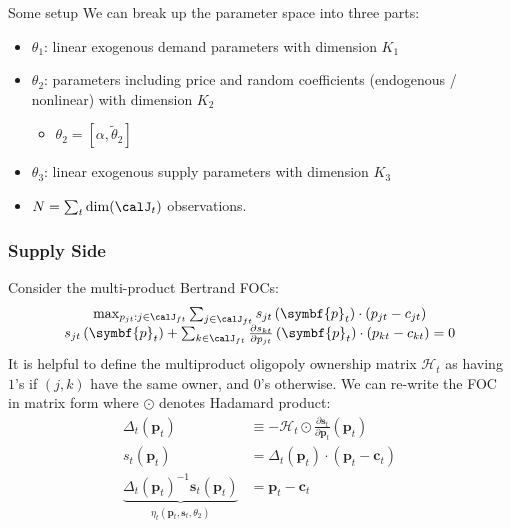\begin{frame}{Some setup}
We can break up the parameter space into three parts:
\begin{itemize}
\item $\theta_1$: linear exogenous demand parameters with dimension $K_1$
 \item $\theta_2$: parameters including price and random coefficients (endogenous / nonlinear) with dimension $K_2$
 \begin{itemize}
 \item $\theta_2 = [\alpha, \widetilde{\theta}_2]$
\end{itemize}
 \item $\theta_3$: linear exogenous supply parameters with dimension $K_3$
 \item $N = \sum_{t} \dim(\calJ_t)$ observations.
\end{itemize}
\end{frame}



\begin{frame}[plain]
\frametitle{Supply Side}
\footnotesize
Consider the multi-product Bertrand FOCs:
\begin{align*}
\begin{array}{c}
\max _{p_{j t}: j \in \calJ_{f t}} \sum_{j \in \calJ_{f t}} s_{j t}\left(\symbf{p}_{t}\right) \cdot\left(p_{j t}-c_{j t}\right) \\
s_{j t}\left(\symbf{p}_{t}\right)+\sum_{k \in \calJ_{f t}} \frac{\partial s_{k t}}{\partial p_{j t}}\left(\symbf{p}_{t}\right) \cdot\left(p_{k t}-c_{k t}\right)=0
\end{array}
\end{align*}
It is helpful to define the \alert{multiproduct oligopoly ownership matrix} $\mathcal{H}_t$ as having $1$'s if $(j,k)$ have the same owner, and $0$'s otherwise. We can re-write the FOC in matrix form where $\odot$ denotes Hadamard product:
\begin{align*}
\Delta_{t}\left(\symbf{p}_{t}\right) &\equiv-\mathcal{H}_{t} \odot \frac{\partial \symbf{s}_{t}}{\partial \symbf{p}_{t}}\left(\symbf{p}_{t}\right)\\
s_{t}\left(\symbf{p}_{t}\right) &=\Delta_{t}\left(\symbf{p}_{t}\right) \cdot\left(\symbf{p}_{t}-\symbf{c}_{t}\right) \\
\underbrace{\Delta_{t}\left(\symbf{p}_{t}\right)^{-1} \symbf{s}_{t}\left(\symbf{p}_{t}\right)}_{\eta_{t}\left(\symbf{p}_{t}, \symbf{s}_{t}, \theta_{2}\right)} &=\symbf{p}_{t}-\symbf{c}_{t}
\end{align*}
\end{frame}



